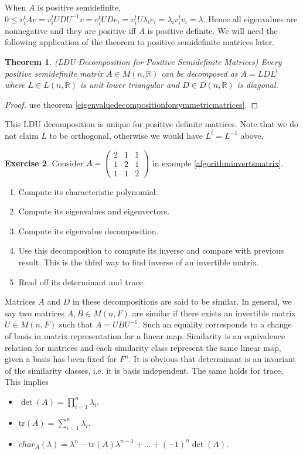 \documentclass[12pt]{amsart}
\newtheorem{theorem}{Theorem}[section]
\theoremstyle{definition}
\newtheorem{exercise}[theorem]{Exercise}
\begin{document}
When $A$ is positive semidefinite, $0 \leq v_i^t A v = v_i^t U D U^{-1} v = v_i^t U D e_i = v_i^t U \lambda_i e_i = \lambda_i v_i^t v_i = \lambda$. Hence all eigenvalues are nonnegative and they are positive iff $A$ is positive definite. We will need the following application of the theorem to positive semidefinite matrices later.

\begin{theorem}\label{LDUdecomposition} (LDU Decomposition for Positive Semidefinite Matrices) Every positive semidefinite matrix $A \in M(n, \mathbb{R})$ can be decomposed as $A = LDL^t$ where $L \in L(n, \mathbb{R})$ is unit lower triangular and $D \in D(n, \mathbb{R})$ is diagonal.
\end{theorem}
\begin{proof} use theorem \ref{eigenvaluedecompositionforsymmetricmatrices}.
\end{proof}

This LDU decomposition is unique for positive definite matrices. Note that we do not claim $L$ to be orthogonal, otherwise we would have $L^t = L^{-1}$ above.

\begin{exercise}\label{} Consider $A = \left(\begin{array}{ccc} 2 & 1 & 1 \\ 1 & 2 & 1 \\ 1 & 1 & 2 \end{array}\right)$ in example \ref{algorithminvertsmatrix}.
\begin{enumerate}[\indent a.]
\item Compute its characteristic polynomial.
\item Compute its eigenvalues and eigenvectors.
\item Compute its eigenvalue decomposition.
\item Use this decomposition to compute its inverse and compare with previous result. This is the third way to find inverse of an invertible matrix.
\item Read off its determinant and trace.
\end{enumerate}
\end{exercise}

Matrices $A$ and $D$ in these decompositions are said to be similar. In general, we say two matrices $A, B \in M(n, F)$ are similar if there exists an invertible matrix $U \in M(n, F)$ such that $A = UBU^{-1}$. Such an equality corresponds to a change of basis in matrix representation for a linear map. Similarity is an equivalence relation for matrices and each similarity class represent the same linear map, given a basis has been fixed for $F^n$. It is obvious that determinant is an invariant of the similarity classes, i.e. it is basis independent. The same holds for trace. This implies
\begin{itemize}
\item $\det(A) = \prod\limits_{i = 1}^n \lambda_i$.
\item $\text{tr}(A) = \sum\limits_{i = 1}^n \lambda_i$.
\item $char_A(\lambda) = \lambda^n - \text{tr}(A) \lambda^{n-1} + \ldots + (-1)^n \det(A)$.
\end{itemize}
\end{document}
